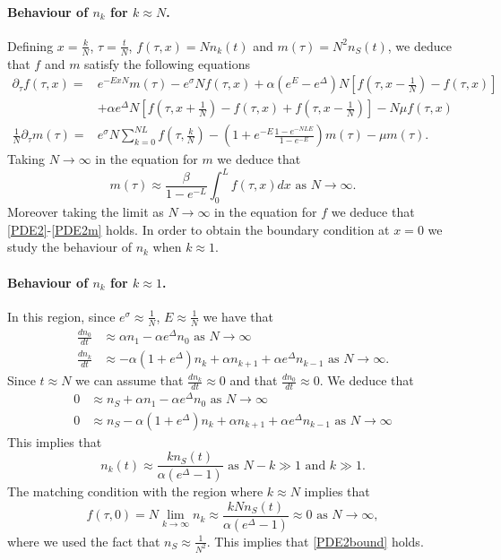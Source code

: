\documentclass{article}
\numberwithin{equation}{section}
\theoremstyle{plain}
\begin{document}
\paragraph{Behaviour of $n_k$ for $k \approx N $.}
Defining $x= \frac{k}{N }$, $\tau = \frac{t }{ N } $, $f(\tau, x)= N n_k(t)$ and $m(\tau )= N^2 n_S (t) $, we deduce that $f$ and $m $ satisfy the following equations 
\begin{align*}
\partial_\tau f (\tau ,x) =& e^{- E x N } m (\tau )  - e^\sigma N f(\tau, x) + \alpha (e^E - e^\Delta ) N \left[ f\left(\tau, x- \frac{1}{N } \right)  - f(\tau, x) \right] \\
& + \alpha e^\Delta N \left[ f\left(\tau, x+\frac{1}{N } \right) - f(\tau, x) + f\left(\tau, x-\frac{1}{N } \right)  \right] - N \mu f(\tau,x) \\
\frac{1}{N} \partial_\tau m(\tau) =& e^\sigma N \sum_{k=0}^{NL} f \left(\tau, \frac{k}{N} \right) -  \left( 1 + e^{- E } \frac{1- e^{- N L E }}{1- e^{- E }} \right)  m(\tau ) - \mu m(\tau). 
\end{align*}
Taking $N \to \infty$ in the equation for $m $ we deduce that 
\[
m(\tau ) \approx \frac{\beta}{1-e^{-L}}  \int_0^L f(\tau, x) dx \text{ as } N \to \infty. 
\]
Moreover taking the limit as $N \to \infty $ in the equation for $f$ we deduce that \eqref{PDE2}-\eqref{PDE2m} holds. 
In order to obtain the boundary condition at $x=0$ we study the behaviour of $n_k $ when $k \approx 1$. 

\paragraph{Behaviour of $n_k$ for $k \approx 1 $.}
In this region, since $e^\sigma \approx \frac{1}{N}$, $E \approx \frac{1}{N}$ we have that 
   \begin{align*}  
    \frac{d n_0 }{dt} & \approx  \alpha  n_1 - \alpha e^{\Delta} n_0 \text{ as } N \to \infty \\
        \frac{d n_k }{dt} & \approx  - \alpha \left(  1 + e^\Delta  \right)  n_k + \alpha  n_{k+1}  + \alpha e^{\Delta} n_{k-1} \text{ as } N \to \infty. 
         \end{align*}
         Since $t \approx N $ we can assume that $\frac{d n_k }{dt} \approx 0$ and that $\frac{d n_0 }{dt} \approx 0$. 
         We deduce that 
            \begin{align*}  
0 & \approx n_S +  \alpha  n_1 - \alpha e^{\Delta} n_0 \text{ as } N \to \infty \\
0& \approx n_S - \alpha \left(  1 + e^\Delta  \right)  n_k + \alpha  n_{k+1}  + \alpha e^{\Delta} n_{k-1} \text{ as } N \to \infty 
         \end{align*}
This implies that 
\[
n_k (t) \approx \frac{ k n_S(t) }{\alpha (e^\Delta -1 )}    \text{ as } N - k \gg 1 \text{ and } k \gg 1. 
\]
The matching condition with the region where $k \approx N $ implies that 
\[
f(\tau, 0 ) = N  \lim_{k \to \infty } n_k \approx  \frac{ k  N n_S(t) }{\alpha (e^\Delta -1 )}\approx 0 \text{ as } N \to \infty, 
\] 
where we used the fact that $n_S \approx \frac{1}{N^2}$. 
This implies that \eqref{PDE2bound} holds. 
\end{document}
